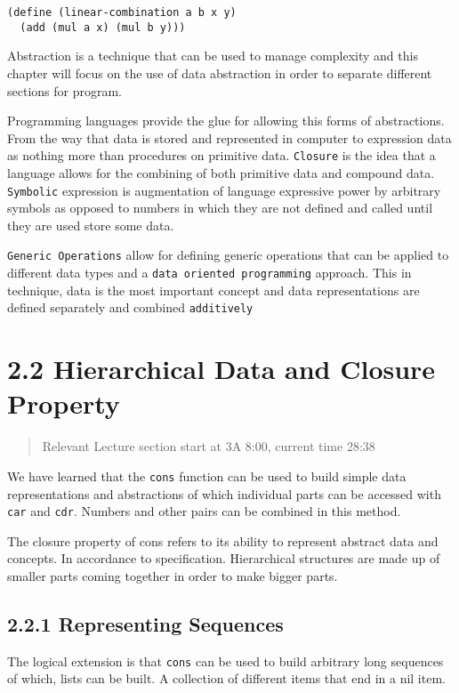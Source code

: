 \documentclass[11pt]{article}
\begin{document}
\begin{verbatim}
(define (linear-combination a b x y)
  (add (mul a x) (mul b y)))
\end{verbatim}

Abstraction is a technique that can be used to manage complexity and
this chapter will focus on the use of data abstraction in order to
separate different sections for program.

Programming languages provide the glue for allowing this forms of
abstractions. From the way that data is stored and represented in
computer to expression data as nothing more than procedures on primitive
data. \texttt{Closure} is the idea that a language allows for the combining of
both primitive data and compound data. \texttt{Symbolic} expression is
augmentation of language expressive power by arbitrary symbols as
opposed to numbers in which they are not defined and called until they
are used store some data.

\texttt{Generic Operations} allow for defining generic operations that can be
applied to different data types and a \texttt{data oriented programming}
approach. This in technique, data is the most important concept and data
representations are defined separately and combined \texttt{additively}


\section{2.2 Hierarchical Data and Closure Property}
\label{sec:orgae8fbe9}
\begin{quote}
Relevant Lecture section start at 3A 8:00, current time 28:38
\end{quote}

We have learned that the \texttt{cons} function can be used to build simple
data representations and abstractions of which individual parts can be
accessed with \texttt{car} and \texttt{cdr}. Numbers and other pairs can be combined
in this method.

The closure property of cons refers to its ability to represent abstract
data and concepts. In accordance to specification. Hierarchical
structures are made up of smaller parts coming together in order to make
bigger parts.

\subsection{2.2.1 Representing Sequences}
\label{sec:org8e9113c}
The logical extension is that \texttt{cons} can be used to build arbitrary long
sequences of which, lists can be built. A collection of different items
that end in a nil item.
\end{document}
